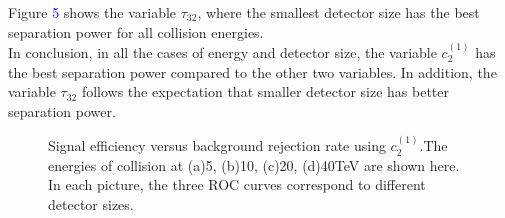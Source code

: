 Figure \textcolor{blue}{5} shows the variable $\tau_{32}$, where the smallest detector size has the best separation power for all collision energies.\\

In conclusion, in all the cases of energy and detector size, the variable $c_2^{(1)}$ has the best separation power compared to the other two variables. In addition, the variable $\tau_{32}$ follows the expectation that smaller detector size has better separation power.\\

\label{sec:efficiency}


\begin{figure}
\begin{center}
\end{center}
\caption{Signal efficiency versus background rejection rate using $c_2^{(1)}$.The energies of collision at (a)5, (b)10, (c)20, (d)40TeV are shown here. In each picture, the three ROC curves correspond to different detector sizes.}
\label{fig:cluster_c2b1}
\end{figure}


